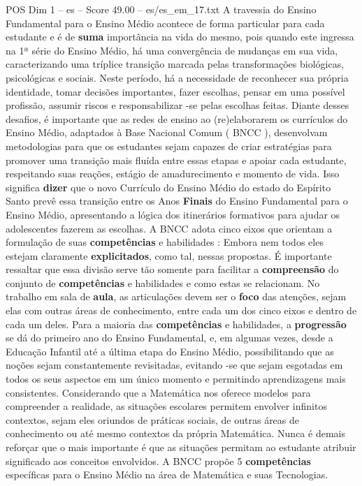 \begin{textsample}{POS Dim 1 – es – Score 49.00 – es/es\_em\_17.txt}
A travessia do Ensino Fundamental para o Ensino Médio acontece de forma particular para cada estudante e é de \textbf{suma} importância na vida do mesmo, pois quando este ingressa na 1ª série do Ensino Médio, há uma convergência de mudanças em sua vida, caracterizando uma tríplice transição marcada pelas transformações biológicas, psicológicas e sociais.
Neste período, há a necessidade de reconhecer sua própria identidade, tomar decisões importantes, fazer escolhas, pensar em uma possível profissão, assumir riscos e responsabilizar -se pelas escolhas feitas.
Diante desses desafios, é importante que as redes de ensino ao (re)elaborarem os currículos do Ensino Médio, adaptados à Base Nacional Comum ( BNCC ), desenvolvam metodologias para que os estudantes sejam capazes de criar estratégias para promover uma transição mais fluída entre essas etapas e apoiar cada estudante, respeitando suas reações, estágio de amadurecimento e momento de vida.
Isso significa \textbf{dizer} que o novo Currículo do Ensino Médio do estado do Espírito Santo prevê essa transição entre os Anos \textbf{Finais} do Ensino Fundamental para o Ensino Médio, apresentando a lógica dos itinerários formativos para ajudar os adolescentes fazerem as escolhas.
A BNCC adota cinco eixos que orientam a formulação de suas \textbf{competências} e habilidades : Embora nem todos eles estejam claramente \textbf{explicitados}, como tal, nessas propostas.
É importante ressaltar que essa divisão serve tão somente para facilitar a \textbf{compreensão} do conjunto de \textbf{competências} e habilidades e como estas se relacionam.
No trabalho em sala de \textbf{aula}, as articulações devem ser o \textbf{foco} das atenções, sejam elas com outras áreas de conhecimento, entre cada um dos cinco eixos e dentro de cada um deles.
Para a maioria das \textbf{competências} e habilidades, a \textbf{progressão} se dá do primeiro ano do Ensino Fundamental, e, em algumas vezes, desde a Educação Infantil até a última etapa do Ensino Médio, possibilitando que as noções sejam constantemente revisitadas, evitando -se que sejam esgotadas em todos os seus aspectos em um único momento e permitindo aprendizagens mais consistentes.
Considerando que a Matemática nos oferece modelos para compreender a realidade, as situações escolares permitem envolver infinitos contextos, sejam eles oriundos de práticas sociais, de outras áreas de conhecimento ou até mesmo contextos da própria Matemática.
Nunca é demais reforçar que o mais importante é que as situações permitam ao estudante atribuir significado aos conceitos envolvidos.
A BNCC propõe 5 \textbf{competências} específicas para o Ensino Médio na área de Matemática e suas Tecnologias.

\end{textsample}
